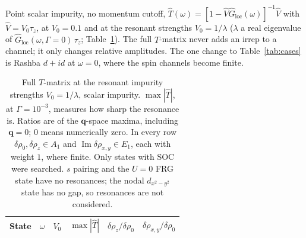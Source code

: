 \documentclass[aps,prb,twocolumn,superscriptaddress,nofootinbib]{revtex4-2}
\newcommand{\bq}{\bm{q}}
\begin{document}
Point scalar impurity, no momentum cutoff, $\hat T(\omega) = [1 - \hat V \hat G_{\text{loc}}(\omega)]^{-1} \hat V$ with $\hat V = V_0 \tau_z$, at $V_0 = 0.1$ and at the resonant strengths $V_0 = 1/\lambda$ ($\lambda$ a real eigenvalue of $\hat G_{\text{loc}}(\omega, \Gamma = 0)\, \tau_z$; Table~\ref{tab:resonant}).
The full $T$-matrix never adds an irrep to a channel; it only changes relative amplitudes.
The one change to Table~\ref{tab:cases} is Rashba $d+id$ at $\omega = 0$, where the spin channels become finite.

\begin{table}[tp]
    \caption{Full $T$-matrix at the resonant impurity strengths $V_0 = 1/\lambda$, scalar impurity.
    $\max|\hat T|$, at $\Gamma = 10^{-3}$, measures how sharp the resonance is.
    Ratios are of the $\bq$-space maxima, including $\bq = 0$; $0$ means numerically zero.
    In every row $\delta\rho_0, \delta\rho_z \in A_1$ and $\operatorname{Im}\delta\rho_{x,y} \in E_1$, each with weight $1$, where finite.
    Only states with SOC were searched.
    $s$ pairing and the $U = 0$ FRG state have no resonances; the nodal $d_{x^2-y^2}$ state has no gap, so resonances are not considered.}
    \label{tab:resonant}
    \begin{ruledtabular}
    \begin{tabular}{llrrrr}
        State & $\omega$ & $V_0$ & $\max|\hat T|$ & $\delta\rho_z/\delta\rho_0$ & $\delta\rho_{x,y}/\delta\rho_0$ \\
        \hline
        
    \end{tabular}
    \end{ruledtabular}
\end{table}
\end{document}
